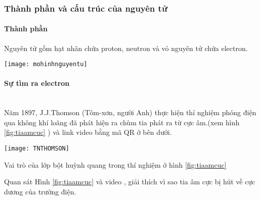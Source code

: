 \subsubsection{Thành phần và cấu trúc của nguyên tử}
\paragraph{Thành phần}
\begin{hoplythuyet}
	Nguyên tử gồm hạt nhân chứa proton, neutron và vỏ nguyên tử chứa electron.
	\begin{center}
		\texttt{[image: mohinhnguyentu]}
	\end{center}
\end{hoplythuyet}
\paragraph{Sự tìm ra electron}
\\
Năm 1897, J.J.Thomson (Tôm-xơn, người Anh) thực hiện thí nghiệm phóng điện qua không khí loãng đã phát hiện ra chùm tia phát ra từ cực âm.(xem hình \ref{fig:tiaamcuc} ) và link video bằng mã QR ở bên dưới.\\ 
\begin{minipage}{0.6\textwidth}
\begin{center}
\texttt{[image: TNTHOMSON]}\\
\label{fig:tiaamcuc}
\end{center}
\end{minipage}
\hfill
\begin{minipage}{0.3\textwidth}
\end{minipage}
\begin{hoivadap}
	Vai trò của lớp bột huỳnh quang trong thí nghiệm ở hình \ref{fig:tiaamcuc}
\end{hoivadap}
%
\begin{hoivadap}
Quan sát Hình \ref{fig:tiaamcuc} và video , giải thích vì sao tia âm cực bị hút về cực dương của trường điện.
\end{hoivadap}
